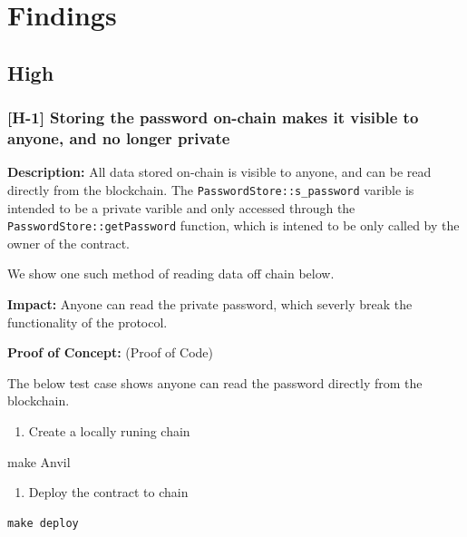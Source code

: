 \documentclass[
  paper=a4,
  ,captions=tableheading
]{scrartcl}
\newenvironment{Shaded}{}{}
\newcommand{\FunctionTok}[1]{\textcolor[rgb]{0.02,0.16,0.49}{#1}}
\newcommand{\NormalTok}[1]{#1}
\providecommand{\tightlist}{%
  \setlength{\itemsep}{0pt}\setlength{\parskip}{0pt}}
\begin{document}
\section{Findings}\label{findings}

\subsection{High}\label{high}

\subsubsection{{[}H-1{]} Storing the password on-chain makes it visible
to anyone, and no longer
private}\label{h-1-storing-the-password-on-chain-makes-it-visible-to-anyone-and-no-longer-private}

\textbf{Description:} All data stored on-chain is visible to anyone, and
can be read directly from the blockchain. The
\texttt{PasswordStore::s\_password} varible is intended to be a private
varible and only accessed through the
\texttt{PasswordStore::getPassword} function, which is intened to be
only called by the owner of the contract.

We show one such method of reading data off chain below.

\textbf{Impact:} Anyone can read the private password, which severly
break the functionality of the protocol.

\textbf{Proof of Concept:} (Proof of Code)

The below test case shows anyone can read the password directly from the
blockchain.

\begin{enumerate}
\def\labelenumi{\arabic{enumi}.}
\tightlist
\item
  Create a locally runing chain
\end{enumerate}

\begin{Shaded}
\begin{Highlighting}[]
\FunctionTok{make}\NormalTok{ Anvil}
\end{Highlighting}
\end{Shaded}

\begin{enumerate}
\def\labelenumi{\arabic{enumi}.}
\setcounter{enumi}{1}
\tightlist
\item
  Deploy the contract to chain
\end{enumerate}

\begin{verbatim}
make deploy
\end{verbatim}
\end{document}
